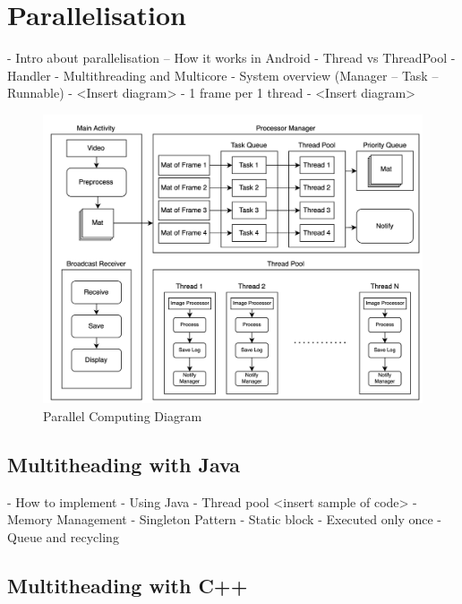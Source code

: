     \section{Parallelisation}
        -	Intro about parallelisation – How it works in Android
            - Thread vs ThreadPool
            - Handler
        -	Multithreading and Multicore
        -	System overview (Manager – Task – Runnable)
            - <Insert diagram>
        -	1 frame per 1 thread
            - <Insert diagram>

        \begin{figure}[!ht]
            \includegraphics[width=6in]{images/chapter3/parallel.png}
            \caption{Parallel Computing Diagram}
            \label{systemOverview}
        \end{figure}

        \subsection{Multitheading with Java}
            -	How to implement
                - Using Java
                - Thread pool
                    <insert sample of code>
            -	Memory Management
                - Singleton Pattern
                - Static block
                    - Executed only once
                - Queue and recycling

        \subsection{Multitheading with C++}

